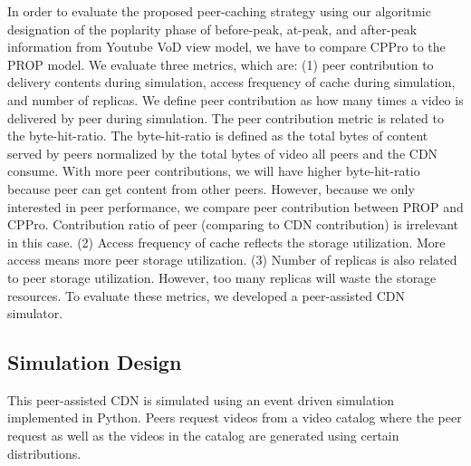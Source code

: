 \documentclass[10pt,final,journal,a4paper]{IEEEtran}
\begin{document}
In order to evaluate the proposed peer-caching strategy using our algoritmic designation of the poplarity phase of before-peak, at-peak, and after-peak information from Youtube VoD view model, we have to compare CPPro to the PROP model.
We evaluate three metrics, which are: (1) peer contribution to delivery contents during simulation,  access frequency of cache during simulation, and number of replicas. 
We define peer contribution as how many times a video is delivered by peer during simulation.
The peer contribution metric is related to the byte-hit-ratio. 
The byte-hit-ratio is defined as the total bytes of content served by peers normalized by the total bytes of video all peers and the CDN consume.
With more peer contributions, we will have higher byte-hit-ratio because peer can get content from other peers. 
However, because we only interested in peer performance, we compare peer contribution between PROP and CPPro.
Contribution ratio of peer (comparing to CDN contribution) is irrelevant in this case.
(2) Access frequency of cache reflects the storage utilization. 
More access means more peer storage utilization.  
(3) Number of replicas is also related to peer storage utilization.  
However, too many replicas will waste the storage resources.
To evaluate these metrics, we developed a peer-assisted CDN simulator. 


\subsection{Simulation Design}\label{simulationdesign}

This peer-assisted CDN is simulated using an event driven simulation implemented in Python. 
Peers request videos from a video catalog where the peer request as well as the videos in the catalog are generated using certain distributions.

\end{document}

